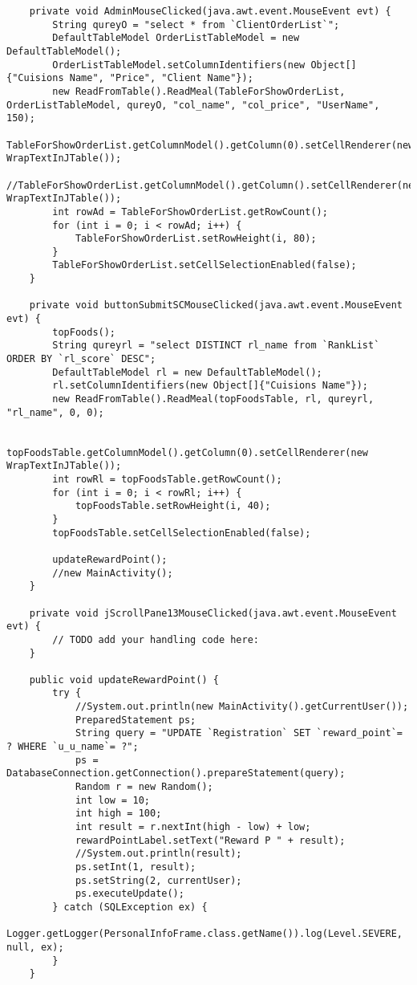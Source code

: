 \documentclass[12pt,a4paper]{article}
\begin{document}
\begin{lstlisting}
    private void AdminMouseClicked(java.awt.event.MouseEvent evt) {                                   
        String qureyO = "select * from `ClientOrderList`";
        DefaultTableModel OrderListTableModel = new DefaultTableModel();
        OrderListTableModel.setColumnIdentifiers(new Object[]{"Cuisions Name", "Price", "Client Name"});
        new ReadFromTable().ReadMeal(TableForShowOrderList, OrderListTableModel, qureyO, "col_name", "col_price", "UserName", 150);
        TableForShowOrderList.getColumnModel().getColumn(0).setCellRenderer(new WrapTextInJTable());
        //TableForShowOrderList.getColumnModel().getColumn().setCellRenderer(new WrapTextInJTable());
        int rowAd = TableForShowOrderList.getRowCount();
        for (int i = 0; i < rowAd; i++) {
            TableForShowOrderList.setRowHeight(i, 80);
        }
        TableForShowOrderList.setCellSelectionEnabled(false);
    }                                  

    private void buttonSubmitSCMouseClicked(java.awt.event.MouseEvent evt) {                                            
        topFoods();
        String qureyrl = "select DISTINCT rl_name from `RankList` ORDER BY `rl_score` DESC";
        DefaultTableModel rl = new DefaultTableModel();
        rl.setColumnIdentifiers(new Object[]{"Cuisions Name"});
        new ReadFromTable().ReadMeal(topFoodsTable, rl, qureyrl, "rl_name", 0, 0);

        topFoodsTable.getColumnModel().getColumn(0).setCellRenderer(new WrapTextInJTable());
        int rowRl = topFoodsTable.getRowCount();
        for (int i = 0; i < rowRl; i++) {
            topFoodsTable.setRowHeight(i, 40);
        }
        topFoodsTable.setCellSelectionEnabled(false);

        updateRewardPoint();
        //new MainActivity();
    }                                           

    private void jScrollPane13MouseClicked(java.awt.event.MouseEvent evt) {                                           
        // TODO add your handling code here:
    }                                          

    public void updateRewardPoint() {
        try {
            //System.out.println(new MainActivity().getCurrentUser());
            PreparedStatement ps;
            String query = "UPDATE `Registration` SET `reward_point`= ? WHERE `u_u_name`= ?";
            ps = DatabaseConnection.getConnection().prepareStatement(query);
            Random r = new Random();
            int low = 10;
            int high = 100;
            int result = r.nextInt(high - low) + low;
            rewardPointLabel.setText("Reward P " + result);
            //System.out.println(result);
            ps.setInt(1, result);
            ps.setString(2, currentUser);
            ps.executeUpdate();
        } catch (SQLException ex) {
            Logger.getLogger(PersonalInfoFrame.class.getName()).log(Level.SEVERE, null, ex);
        }
    }


\end{lstlisting}
\end{document}
